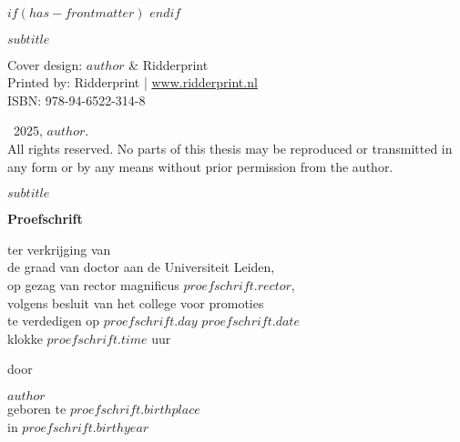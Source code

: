 
$if(has-frontmatter)$
\frontmatter
$endif$


\begin{titlepage}
  \hspace{0pt}
  \vfill
  \begin{center}
     \par %
    \smallskip
    \textsf{\Large $subtitle$} \par
    \vfill
  \end{center}
\end{titlepage}


\clearpage
\thispagestyle{empty}
\vspace*{\fill} %

\begingroup
  \setlength{\parskip}{\baselineskip}
  \begin{flushleft}
    Cover design: $author$ \& Ridderprint \\
    Printed by: Ridderprint | \href{www.ridderprint.nl}{www.ridderprint.nl} \\
    ISBN: 978-94-6522-314-8\par

    \textcopyright \ 2025, $author$. \\
    All rights reserved. No parts of this thesis may be reproduced or transmitted in any form or by any means without prior permission from the author.
  \end{flushleft}
\endgroup


\clearpage
\thispagestyle{empty}

\begin{center}
   \par %
  \smallskip
  \textsf{\Large $subtitle$} \par
  \vfill
  \textbf{\large Proefschrift} \par
  \vspace{2\baselineskip}
  \large{
    ter verkrijging van \\
    de graad van doctor aan de Universiteit Leiden, \\
    op gezag van rector magnificus $proefschrift.rector$, \\
    volgens besluit van het college voor promoties \\
    te verdedigen op $proefschrift.day$ $proefschrift.date$ \\
    klokke $proefschrift.time$ uur
  } \par
  \vspace{2\baselineskip}
  \large{door} \par
  \vspace{2\baselineskip}
  \large{$author$} \\
  \normalsize{geboren te $proefschrift.birthplace$\\in $proefschrift.birthyear$} \par
\end{center}


